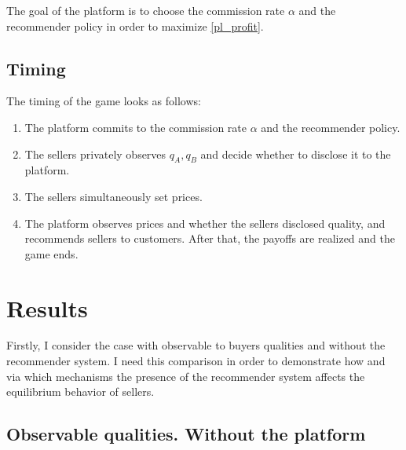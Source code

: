 \documentclass[a4paper]{article}
\begin{document}
The goal of the platform is to choose the commission rate $\alpha$ and the recommender policy in order to maximize \eqref{pl_profit}.

	
	\subsection{Timing}
The timing of the game looks as follows:
\begin{enumerate}
	\item The platform commits to the commission rate $\alpha$ and the recommender policy.
	\item The sellers privately observes $q_A, q_B$ and decide whether to disclose it to the platform.
	\item The sellers simultaneously set prices.
	\item The platform observes prices and whether the sellers disclosed quality, and recommends sellers to customers. After that, the payoffs are realized and the game ends.
\end{enumerate}

\section{Results}
Firstly, I consider the case with observable to buyers qualities and without the recommender system. I need this comparison in order to demonstrate how and via which mechanisms the presence of the recommender system affects the equilibrium behavior of sellers.

	
	
	\subsection{Observable qualities. Without the platform}
\end{document}
